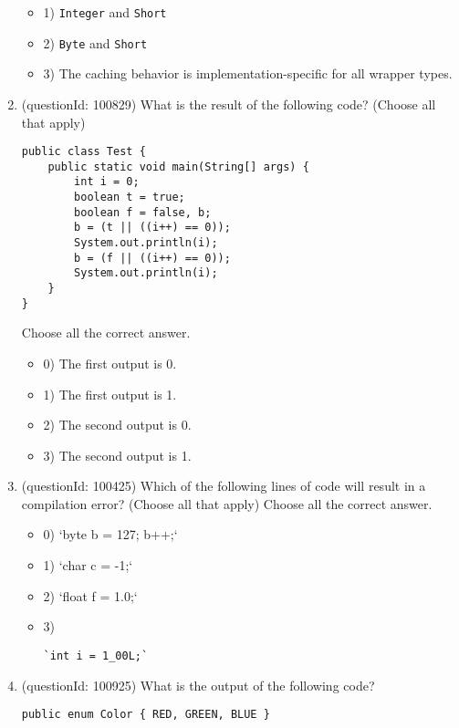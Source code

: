 \documentclass[12pt]{article}
\begin{document}
\begin{enumerate}[label=(\arabic*)]
\begin{itemize}
\item 1) \verb|Integer| and \verb|Short|

\item 2) \verb|Byte| and \verb|Short|

\item 3) The caching behavior is implementation-specific for all wrapper types.

\end{itemize}
\item (questionId: 100829) What is the result of the following code? (Choose all that apply)\n\begin{verbatim}
public class Test {
    public static void main(String[] args) {
        int i = 0;
        boolean t = true;
        boolean f = false, b;
        b = (t || ((i++) == 0));
        System.out.println(i);
        b = (f || ((i++) == 0));
        System.out.println(i);
    }
}
\end{verbatim}
Choose all the correct answer.\begin{itemize}
\item 0) The first output is 0.

\item 1) The first output is 1.

\item 2) The second output is 0.

\item 3) The second output is 1.

\end{itemize}
\item (questionId: 100425) Which of the following lines of code will result in a compilation error? (Choose all that apply)
Choose all the correct answer.\begin{itemize}
\item 0) `byte b = 127; b++;`

\item 1) `char c = -1;`

\item 2) `float f = 1.0;`

\item 3) \begin{verbatim}`int i = 1_00L;`\end{verbatim}

\end{itemize}
\item (questionId: 100925) What is the output of the following code?\n\begin{verbatim}
public enum Color { RED, GREEN, BLUE }


\end{verbatim}
\end{enumerate}
\end{document}
